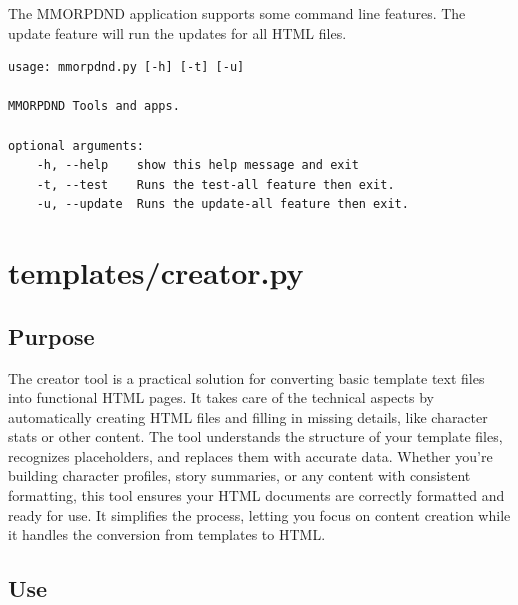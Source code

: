 The MMORPDND application supports some command line features. The update feature will run the updates for all HTML files.

\begin{lstlisting}
usage: mmorpdnd.py [-h] [-t] [-u]

MMORPDND Tools and apps.

optional arguments:
	-h, --help    show this help message and exit
	-t, --test    Runs the test-all feature then exit.
	-u, --update  Runs the update-all feature then exit.
\end{lstlisting}





























\section{templates/creator.py}



\subsection{Purpose}

The creator tool is a practical solution for converting basic template text files into functional HTML pages. It takes care of the technical aspects by automatically creating HTML files and filling in missing details, like character stats or other content. The tool understands the structure of your template files, recognizes placeholders, and replaces them with accurate data. Whether you're building character profiles, story summaries, or any content with consistent formatting, this tool ensures your HTML documents are correctly formatted and ready for use. It simplifies the process, letting you focus on content creation while it handles the conversion from templates to HTML.

\subsection{Use}

